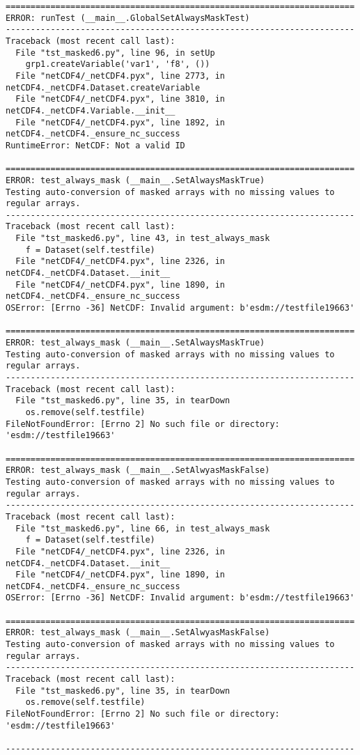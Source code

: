 \begin{verbatim}
======================================================================
ERROR: runTest (__main__.GlobalSetAlwaysMaskTest)
----------------------------------------------------------------------
Traceback (most recent call last):
  File "tst_masked6.py", line 96, in setUp
    grp1.createVariable('var1', 'f8', ())
  File "netCDF4/_netCDF4.pyx", line 2773, in netCDF4._netCDF4.Dataset.createVariable
  File "netCDF4/_netCDF4.pyx", line 3810, in netCDF4._netCDF4.Variable.__init__
  File "netCDF4/_netCDF4.pyx", line 1892, in netCDF4._netCDF4._ensure_nc_success
RuntimeError: NetCDF: Not a valid ID

======================================================================
ERROR: test_always_mask (__main__.SetAlwaysMaskTrue)
Testing auto-conversion of masked arrays with no missing values to regular arrays.
----------------------------------------------------------------------
Traceback (most recent call last):
  File "tst_masked6.py", line 43, in test_always_mask
    f = Dataset(self.testfile)
  File "netCDF4/_netCDF4.pyx", line 2326, in netCDF4._netCDF4.Dataset.__init__
  File "netCDF4/_netCDF4.pyx", line 1890, in netCDF4._netCDF4._ensure_nc_success
OSError: [Errno -36] NetCDF: Invalid argument: b'esdm://testfile19663'

======================================================================
ERROR: test_always_mask (__main__.SetAlwaysMaskTrue)
Testing auto-conversion of masked arrays with no missing values to regular arrays.
----------------------------------------------------------------------
Traceback (most recent call last):
  File "tst_masked6.py", line 35, in tearDown
    os.remove(self.testfile)
FileNotFoundError: [Errno 2] No such file or directory: 'esdm://testfile19663'

======================================================================
ERROR: test_always_mask (__main__.SetAlwyasMaskFalse)
Testing auto-conversion of masked arrays with no missing values to regular arrays.
----------------------------------------------------------------------
Traceback (most recent call last):
  File "tst_masked6.py", line 66, in test_always_mask
    f = Dataset(self.testfile)
  File "netCDF4/_netCDF4.pyx", line 2326, in netCDF4._netCDF4.Dataset.__init__
  File "netCDF4/_netCDF4.pyx", line 1890, in netCDF4._netCDF4._ensure_nc_success
OSError: [Errno -36] NetCDF: Invalid argument: b'esdm://testfile19663'

======================================================================
ERROR: test_always_mask (__main__.SetAlwyasMaskFalse)
Testing auto-conversion of masked arrays with no missing values to regular arrays.
----------------------------------------------------------------------
Traceback (most recent call last):
  File "tst_masked6.py", line 35, in tearDown
    os.remove(self.testfile)
FileNotFoundError: [Errno 2] No such file or directory: 'esdm://testfile19663'

----------------------------------------------------------------------
\end{verbatim}

